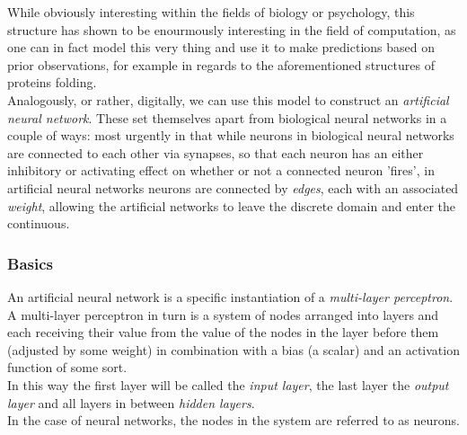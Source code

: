 \noindent While obviously interesting within the fields of biology or psychology, this structure has shown 
to be enourmously interesting in the field of computation, as one can in fact model this very 
thing and use it to make predictions based on prior observations, for example in regards to the 
aforementioned structures of proteins folding.\\
Analogously, or rather, digitally, we can use this model to construct an \textit{artificial 
neural network}.
These set themselves apart from biological neural networks in a couple of ways: most urgently in that while neurons in biological neural networks are connected to each other via synapses, so that each neuron has an either inhibitory or activating effect on whether or not a connected neuron 'fires', in artificial neural networks neurons are connected by \textit{edges}, each with an associated \textit{weight}, allowing the artificial networks to leave the discrete domain and enter the continuous.

\subsubsection{Basics}
An artificial neural network is a specific instantiation of a \textit{multi-layer perceptron}.
A multi-layer perceptron in turn is a system of nodes arranged into layers and each receiving their value from the value of the nodes in the layer before them (adjusted by some weight) in combination with a bias (a scalar) and an activation function of some sort. \\
In this way the first layer will be called the \textit{input layer}, the last layer the \textit{output layer} and all layers in between \textit{hidden layers}. \\
In the case of neural networks, the nodes in the system are referred to as neurons.

